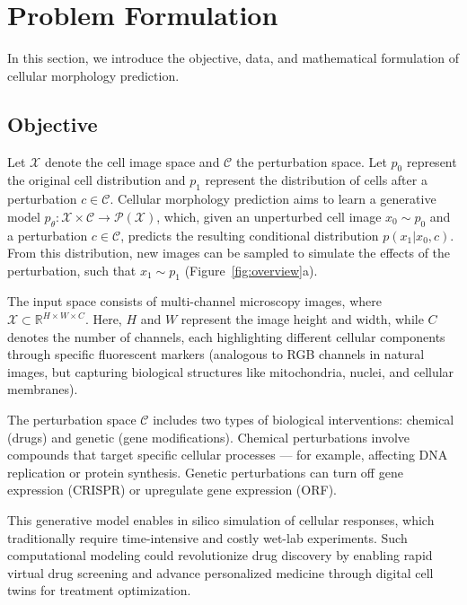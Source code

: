 \section{Problem Formulation}
\label{sec:background}

In this section, we introduce the objective, data, and mathematical formulation of cellular morphology prediction.

\subsection{Objective}

Let $\mathcal{X}$ denote the cell image space and $\mathcal{C}$ the perturbation space. Let $p_0$ represent the original cell distribution and $p_1$ represent the distribution of cells after a perturbation $c \in \mathcal{C}$. Cellular morphology prediction aims to learn a generative model $p_\theta: \mathcal{X} \times \mathcal{C} \to \mathcal{P}(\mathcal{X})$, which, given an unperturbed cell image $x_0 \sim p_0$ and a perturbation $c \in \mathcal{C}$, predicts the resulting conditional distribution $p(x_1 | x_0, c)$. From this distribution, new images can be sampled to simulate the effects of the perturbation, such that $x_1 \sim p_1$ (Figure~\ref{fig:overview}a).

The input space consists of multi-channel microscopy images, where $\mathcal{X} \subset \mathbb{R}^{H \times W \times C}$. Here, $H$ and $W$ represent the image height and width, while $C$ denotes the number of channels, each highlighting different cellular components through specific fluorescent markers (analogous to RGB channels in natural images, but capturing biological structures like mitochondria, nuclei, and cellular membranes).

The perturbation space $\mathcal{C}$ includes two types of biological interventions: chemical (drugs) and genetic (gene modifications). Chemical perturbations involve compounds that target specific cellular processes --- for example, affecting DNA replication or protein synthesis. 
Genetic perturbations can turn off gene expression (CRISPR) or upregulate gene expression (ORF).

This generative model enables in silico simulation of cellular responses, which traditionally require time-intensive and costly wet-lab experiments. Such computational modeling could revolutionize drug discovery by enabling rapid virtual drug screening and advance personalized medicine through digital cell twins for treatment optimization.

